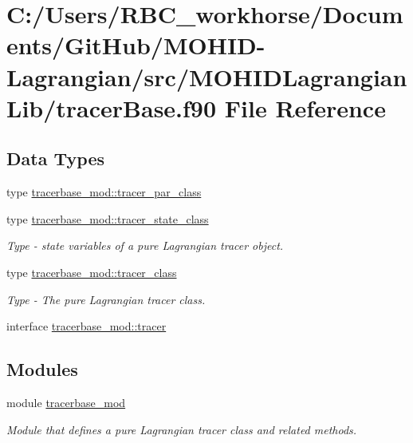 \hypertarget{tracer_base_8f90}{}\section{C\+:/\+Users/\+R\+B\+C\+\_\+workhorse/\+Documents/\+Git\+Hub/\+M\+O\+H\+I\+D-\/\+Lagrangian/src/\+M\+O\+H\+I\+D\+Lagrangian\+Lib/tracer\+Base.f90 File Reference}
\label{tracer_base_8f90}
\subsection*{Data Types}
\begin{DoxyCompactItemize}
\item 
type \mbox{\hyperlink{structtracerbase__mod_1_1tracer__par__class}{tracerbase\+\_\+mod\+::tracer\+\_\+par\+\_\+class}}
\item 
type \mbox{\hyperlink{structtracerbase__mod_1_1tracer__state__class}{tracerbase\+\_\+mod\+::tracer\+\_\+state\+\_\+class}}
\begin{DoxyCompactList}\small\item\em Type -\/ state variables of a pure Lagrangian tracer object. \end{DoxyCompactList}\item 
type \mbox{\hyperlink{structtracerbase__mod_1_1tracer__class}{tracerbase\+\_\+mod\+::tracer\+\_\+class}}
\begin{DoxyCompactList}\small\item\em Type -\/ The pure Lagrangian tracer class. \end{DoxyCompactList}\item 
interface \mbox{\hyperlink{interfacetracerbase__mod_1_1tracer}{tracerbase\+\_\+mod\+::tracer}}
\end{DoxyCompactItemize}
\subsection*{Modules}
\begin{DoxyCompactItemize}
\item 
module \mbox{\hyperlink{namespacetracerbase__mod}{tracerbase\+\_\+mod}}
\begin{DoxyCompactList}\small\item\em Module that defines a pure Lagrangian tracer class and related methods. \end{DoxyCompactList}\end{DoxyCompactItemize}
